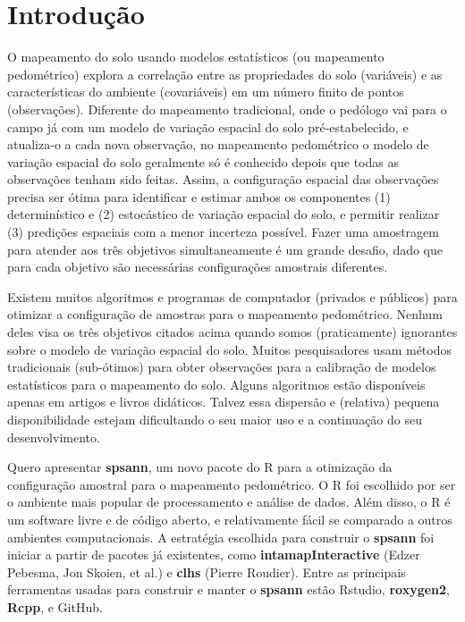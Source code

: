 \section{Introdução}

O mapeamento do solo usando modelos estatísticos (ou mapeamento pedométrico) 
explora a correlação entre as propriedades do solo (variáveis) e as 
características do ambiente (covariáveis) em um número finito de pontos 
(observações). Diferente do mapeamento tradicional, onde o pedólogo vai para o 
campo já com um modelo de variação espacial do solo pré-estabelecido, e 
atualiza-o a cada nova observação, no mapeamento pedométrico o modelo de 
variação espacial do solo geralmente só é conhecido depois que todas as 
observações tenham sido feitas. Assim, a configuração espacial das observações 
precisa ser ótima para identificar e estimar ambos os componentes (1) 
determinístico e (2) estocástico de variação espacial do solo, e permitir 
realizar (3) predições espaciais com a menor incerteza possível. Fazer uma 
amostragem para atender aos três objetivos simultaneamente é um grande desafio,
dado que para cada objetivo são necessárias configurações amostrais diferentes.

Existem muitos algoritmos e programas de computador (privados e públicos) para 
otimizar a configuração de amostras para o mapeamento pedométrico. Nenhum deles 
visa os três objetivos citados acima quando somos (praticamente) ignorantes 
sobre o modelo de variação espacial do solo. Muitos pesquisadores usam métodos 
tradicionais (sub-ótimos) para obter observações para a calibração de modelos 
estatísticos para o mapeamento do solo. Alguns algoritmos estão disponíveis 
apenas em artigos e livros didáticos. Talvez essa dispersão e (relativa) pequena
disponibilidade estejam dificultando o seu maior uso e a continuação do seu 
desenvolvimento.

Quero apresentar \textbf{spsann}, um novo pacote do R para a otimização da 
configuração amostral para o mapeamento pedométrico. O R foi escolhido por ser 
o ambiente mais popular de processamento e análise de dados. Além disso, o R é 
um software livre e de código aberto, e relativamente fácil se comparado a 
outros ambientes computacionais. A estratégia escolhida para construir o 
\textbf{spsann} foi iniciar a partir de pacotes já existentes, como 
\textbf{intamapInteractive} (Edzer Pebesma, Jon Skoien, et al.) e \textbf{clhs} 
(Pierre Roudier). Entre as principais ferramentas usadas para construir e manter
o \textbf{spsann} estão Rstudio, \textbf{roxygen2}, \textbf{Rcpp}, e GitHub.

